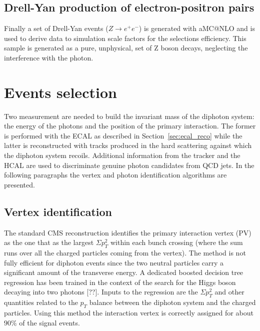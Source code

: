 \subsection{Drell-Yan production of electron-positron pairs}
Finally a set of Drell-Yan events ($Z \to e^{+}e^{-}$) is generated with aMC@NLO and is
used to derive data to simulation scale factors for the selections efficiency. This sample is generated
as a pure, unphysical, set of Z boson decays, neglecting the interference with the photon.

\clearpage
\section{Events selection}
\label{sec:dipho_selection}
Two measurement are needed to build the invariant mass of the diphoton system: the energy of the
photons and the position of the primary interaction. The former is performed with the ECAL as described in
Section~\ref{sec:ecal_reco} while the latter is reconstructed with tracks produced in the hard scattering against which
the diphoton system recoils. Additional information from the tracker and the HCAL are used to discriminate
genuine photon candidates from QCD jets.
In the following paragraphs the vertex and photon identification algorithms are presented.

\subsection{Vertex identification}
The standard CMS reconstruction identifies the primary interaction vertex (PV) as the one 
that as the largest $\Sigma p_T^2$ within each bunch crossing (where the sum runs over all the charged particles
coming from the vertex). The method is not fully efficient for diphoton events since the two neutral
particles carry a significant amount of the transverse energy.
A dedicated boosted decision tree regression has been trained in the context of the search for the
Higgs boson decaying into two photons [??]. Inputs to the regression are the $\Sigma p_T^2$ and
other quantities related to the $p_T$ balance between the diphoton system and the charged particles.
Using this method the interaction vertex is correctly assigned for about $90\%$ of the signal events.

